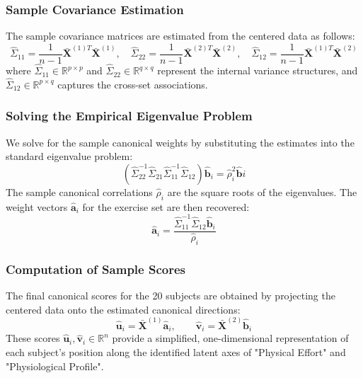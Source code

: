  \subsubsection{Sample Covariance Estimation}
 The sample covariance matrices are estimated from the centered data as follows:\begin{equation}\hat{\Sigma}_{11} = \frac{1}{n-1}\bar{\mathbf{X}}^{(1)T}\bar{\mathbf{X}}^{(1)}, \quad \hat{\Sigma}_{22} = \frac{1}{n-1}\bar{\mathbf{X}}^{(2)T}\bar{\mathbf{X}}^{(2)}, \quad \hat{\Sigma}_{12} = \frac{1}{n-1}\bar{\mathbf{X}}^{(1)T}\bar{\mathbf{X}}^{(2)}
\end{equation}
where $\hat{\Sigma}_{11} \in \mathbb{R}^{p \times p}$ and $\hat{\Sigma}_{22} \in \mathbb{R}^{q \times q}$ represent the internal variance structures, and $\hat{\Sigma}_{12} \in \mathbb{R}^{p \times q}$ captures the cross-set associations.\subsubsection{ Solving the Empirical Eigenvalue Problem}
We solve for the sample canonical weights by substituting the estimates into the standard eigenvalue problem:\begin{equation} \label{eq:sample_eig_b}(\hat{\Sigma}_{22}^{-1} \hat{\Sigma}_{21} \hat{\Sigma}_{11}^{-1} \hat{\Sigma}_{12}) \hat{\mathbf{b}}_i = \hat{\rho}_i^2 \hat{\mathbf{b}}i
\end{equation}
The sample canonical correlations $\hat{\rho}_i$ are the square roots of the eigenvalues. The weight vectors $\hat{\mathbf{a}}_i$ for the exercise set are then recovered:
\begin{equation}
\hat{\mathbf{a}}_i = \frac{\hat{\Sigma}_{11}^{-1} \hat{\Sigma}_{12} \hat{\mathbf{b}}_i}{\hat{\rho}_i}\end{equation}
\subsubsection{ Computation of Sample Scores}
The final canonical scores for the 20 subjects are obtained by projecting the centered data onto the estimated canonical directions:\begin{equation}\hat{\mathbf{u}}_i = \bar{\mathbf{X}}^{(1)} \hat{\mathbf{a}}_i, \qquad \hat{\mathbf{v}}_i = \bar{\mathbf{X}}^{(2)} \hat{\mathbf{b}}_i\end{equation}These scores $\hat{\mathbf{u}}_i, \hat{\mathbf{v}}_i \in \mathbb{R}^{n}$ provide a simplified, one-dimensional representation of each subject's position along the identified latent axes of "Physical Effort" and "Physiological Profile".